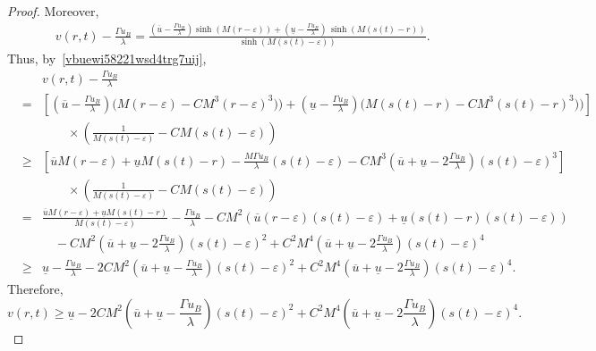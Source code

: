 \documentclass[12pt,a4paper,intlimits,sumlimits]{amsart}
\theoremstyle{definition}
\theoremstyle{plain}
\numberwithin{equation}{section}
\renewcommand{\geq}{\geqslant}
\renewcommand{\ge}{\geqslant}
\begin{document}
\begin{proof}
Moreover,
\begin{eqnarray*}
&&  v(r, t)-\frac{\Gamma u_B}{\lambda}
=
\frac{\left(\overline{u}-\frac{\Gamma u_B}{\lambda}\right)\sinh(M(r-\varepsilon)) + \left(\underline{u}-\frac{\Gamma u_B}{\lambda}\right)\,\sinh(M(s(t)-r))}{\sinh(M(s(t)-\varepsilon))}.
\end{eqnarray*}
Thus, by~\eqref{vbuewi58221wsd4trg7uij},
\begin{eqnarray*}
&&  v(r, t)-\frac{\Gamma u_B}{\lambda}
\\&=&
\left[\left(\overline{u}-\frac{\Gamma u_B}{\lambda}\right) \big(M(r-\varepsilon)-CM^3(r-\varepsilon)^3)\big) 
+ \left(\underline{u}-\frac{\Gamma u_B}{\lambda}\right)\big(M(s(t)-r)-CM^3(s(t)-r)^3)
\big)\right]\\&&\qquad\times
\left(\frac1{M(s(t)-\varepsilon)}
-CM(s(t)-\varepsilon)\right)\\
&\geq & 
\left[\overline{u}M(r-\varepsilon) +\underline{u}M(s(t)-r)-
\frac{M\Gamma u_B}{\lambda}(s(t)-\varepsilon)-CM^3\left(\overline u+\underline u -2\frac{\Gamma u_B}{\lambda}\right)(s(t)-\varepsilon)^3
\right]\\&&\qquad\times
\left(\frac1{M(s(t)-\varepsilon)}
-CM(s(t)-\varepsilon)\right)\\&=&
\frac{\overline{u}M(r-\varepsilon) +\underline{u}M(s(t)-r)}{M(s(t)-\varepsilon)}
-\frac{\Gamma u_B}{\lambda} -CM^2(\overline u (r-\varepsilon)(s(t)-\varepsilon)+\underline u(s(t)-r)(s(t)-\varepsilon))\\
&&\quad -CM^2\left(\overline u+\underline u -2\frac{\Gamma u_B}{\lambda}\right)(s(t)-\varepsilon)^2+C^2M^4\left(\overline u+\underline u -2\frac{\Gamma u_B}{\lambda}\right)(s(t)-\varepsilon)^4 \\
&\ge&
\underline{u}
-\frac{\Gamma u_B}{\lambda} -2CM^2\left(\overline u+\underline u -\frac{\Gamma u_B}{\lambda}\right)(s(t)-\varepsilon)^2+C^2M^4\left(\overline u+\underline u -2\frac{\Gamma u_B}{\lambda}\right)(s(t)-\varepsilon)^4
.
\end{eqnarray*}
Therefore,
\begin{equation}\label{758gfkjhgewaqy5t38ufgggggg8765}
v(r, t)\ge \underline{u}-2CM^2\left(\overline u+\underline u -\frac{\Gamma u_B}{\lambda}\right)(s(t)-\varepsilon)^2+C^2M^4\left(\overline u+\underline u -2\frac{\Gamma u_B}{\lambda}\right)(s(t)-\varepsilon)^4.
\end{equation}


\end{proof}
\end{document}

